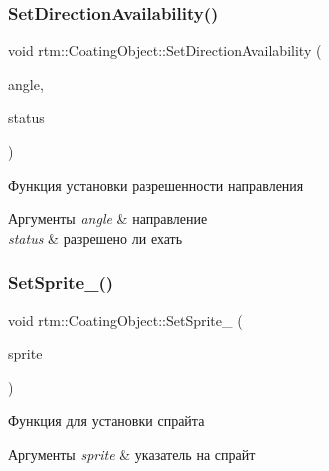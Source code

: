 \subsubsection{\texorpdfstring{Set\+Direction\+Availability()}{SetDirectionAvailability()}}
{\footnotesize\ttfamily void rtm\+::\+Coating\+Object\+::\+Set\+Direction\+Availability (\begin{DoxyParamCaption}\item[{\hyperlink{namespacertm_a69dc82b16a0148c10962caa83d930f89}{Angle\+Type}}]{angle,  }\item[{bool}]{status }\end{DoxyParamCaption})}



Функция установки разрешенности направления 


\begin{DoxyParams}{Аргументы}
{\em angle} & направление \\
\hline
{\em status} & разрешено ли ехать \\
\hline
\end{DoxyParams}
\mbox{\label{classrtm_1_1_coating_object_a1d0227cd023ce6e6bd475194b5cbfe2d}} 
\subsubsection{\texorpdfstring{Set\+Sprite\+\_\+()}{SetSprite\_()}}
{\footnotesize\ttfamily void rtm\+::\+Coating\+Object\+::\+Set\+Sprite\+\_\+ (\begin{DoxyParamCaption}\item[{cocos2d\+::\+Sprite $\ast$const}]{sprite }\end{DoxyParamCaption})\hspace{0.3cm}{\ttfamily [protected]}}



Функция для установки спрайта 


\begin{DoxyParams}{Аргументы}
{\em sprite} & указатель на спрайт \\
\hline
\end{DoxyParams}
\mbox{\label{classrtm_1_1_coating_object_a5bb5e11400d05dc2d50bfbd2021d3aac}} 
